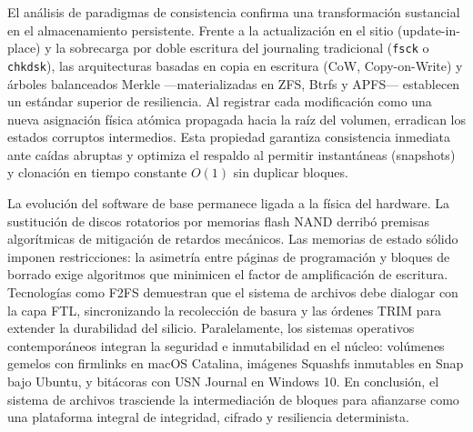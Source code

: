 \documentclass[12pt]{article}
\begin{document}
El análisis de paradigmas de consistencia confirma una transformación sustancial en el almacenamiento persistente. Frente a la actualización en el sitio (update-in-place) y la sobrecarga por doble escritura del journaling tradicional (\texttt{fsck} o \texttt{chkdsk}), las arquitecturas basadas en copia en escritura (CoW, Copy-on-Write) y árboles balanceados Merkle —materializadas en ZFS, Btrfs y APFS— establecen un estándar superior de resiliencia. Al registrar cada modificación como una nueva asignación física atómica propagada hacia la raíz del volumen, erradican los estados corruptos intermedios. Esta propiedad garantiza consistencia inmediata ante caídas abruptas y optimiza el respaldo al permitir instantáneas (snapshots) y clonación en tiempo constante $O(1)$ sin duplicar bloques.

La evolución del software de base permanece ligada a la física del hardware. La sustitución de discos rotatorios por memorias flash NAND derribó premisas algorítmicas de mitigación de retardos mecánicos. Las memorias de estado sólido imponen restricciones: la asimetría entre páginas de programación y bloques de borrado exige algoritmos que minimicen el factor de amplificación de escritura. Tecnologías como F2FS demuestran que el sistema de archivos debe dialogar con la capa FTL, sincronizando la recolección de basura y las órdenes TRIM para extender la durabilidad del silicio. Paralelamente, los sistemas operativos contemporáneos integran la seguridad e inmutabilidad en el núcleo: volúmenes gemelos con firmlinks en macOS Catalina, imágenes Squashfs inmutables en Snap bajo Ubuntu, y bitácoras con USN Journal en Windows 10. En conclusión, el sistema de archivos trasciende la intermediación de bloques para afianzarse como una plataforma integral de integridad, cifrado y resiliencia determinista.

\nocite{*}
\newpage
\setlength\bibitemsep{0.30em}
\printbibliography[heading=bibintoc, title={Referencias}]
\end{document}

